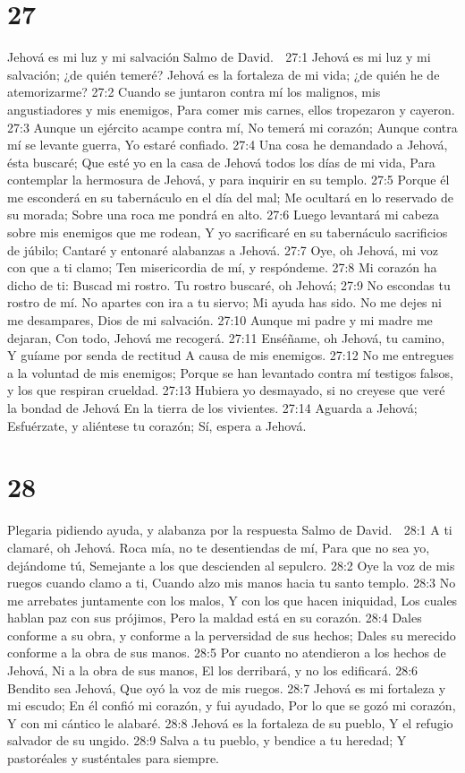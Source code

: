 \chapter{27}

Jehová es mi luz y mi salvación 
Salmo de David. 

27:1 Jehová es mi luz y mi salvación; ¿de quién temeré? 
Jehová es la fortaleza de mi vida; ¿de quién he de atemorizarme? 
27:2 Cuando se juntaron contra mí los malignos, mis angustiadores y mis enemigos, 
Para comer mis carnes, ellos tropezaron y cayeron. 
27:3 Aunque un ejército acampe contra mí, 
No temerá mi corazón; 
Aunque contra mí se levante guerra, 
Yo estaré confiado. 
27:4 Una cosa he demandado a Jehová, ésta buscaré; 
Que esté yo en la casa de Jehová todos los días de mi vida, 
Para contemplar la hermosura de Jehová, y para inquirir en su templo. 
27:5 Porque él me esconderá en su tabernáculo en el día del mal; 
Me ocultará en lo reservado de su morada; 
Sobre una roca me pondrá en alto. 
27:6 Luego levantará mi cabeza sobre mis enemigos que me rodean, 
Y yo sacrificaré en su tabernáculo sacrificios de júbilo; 
Cantaré y entonaré alabanzas a Jehová. 
27:7 Oye, oh Jehová, mi voz con que a ti clamo; 
Ten misericordia de mí, y respóndeme. 
27:8 Mi corazón ha dicho de ti: Buscad mi rostro. 
Tu rostro buscaré, oh Jehová; 
27:9 No escondas tu rostro de mí. 
No apartes con ira a tu siervo; 
Mi ayuda has sido. 
No me dejes ni me desampares, Dios de mi salvación. 
27:10 Aunque mi padre y mi madre me dejaran, 
Con todo, Jehová me recogerá. 
27:11 Enséñame, oh Jehová, tu camino, 
Y guíame por senda de rectitud 
A causa de mis enemigos. 
27:12 No me entregues a la voluntad de mis enemigos; 
Porque se han levantado contra mí testigos falsos, y los que respiran crueldad. 
27:13 Hubiera yo desmayado, si no creyese que veré la bondad de Jehová 
En la tierra de los vivientes. 
27:14 Aguarda a Jehová; 
Esfuérzate, y aliéntese tu corazón; 
Sí, espera a Jehová. 

\chapter{28}

Plegaria pidiendo ayuda, y alabanza por la respuesta 
Salmo de David. 

28:1 A ti clamaré, oh Jehová. 
Roca mía, no te desentiendas de mí, 
Para que no sea yo, dejándome tú, 
Semejante a los que descienden al sepulcro. 
28:2 Oye la voz de mis ruegos cuando clamo a ti, 
Cuando alzo mis manos hacia tu santo templo. 
28:3 No me arrebates juntamente con los malos, 
Y con los que hacen iniquidad, 
Los cuales hablan paz con sus prójimos, 
Pero la maldad está en su corazón. 
28:4 Dales conforme a su obra, y conforme a la perversidad de sus hechos; 
Dales su merecido conforme a la obra de sus manos. 
28:5 Por cuanto no atendieron a los hechos de Jehová, 
Ni a la obra de sus manos, 
El los derribará, y no los edificará. 
28:6 Bendito sea Jehová, 
Que oyó la voz de mis ruegos. 
28:7 Jehová es mi fortaleza y mi escudo; 
En él confió mi corazón, y fui ayudado, 
Por lo que se gozó mi corazón, 
Y con mi cántico le alabaré. 
28:8 Jehová es la fortaleza de su pueblo, 
Y el refugio salvador de su ungido. 
28:9 Salva a tu pueblo, y bendice a tu heredad; 
Y pastoréales y susténtales para siempre. 

